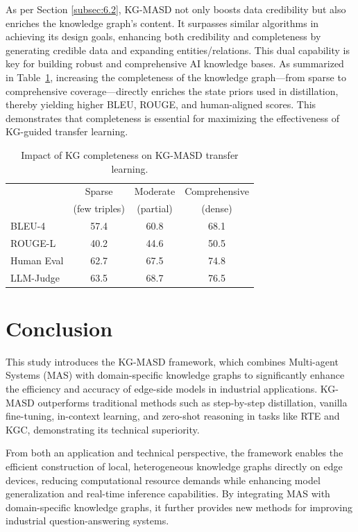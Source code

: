 \documentclass[preprint,12pt]{elsarticle}
\def\textbf#1{#1}%
\def\textit#1{#1}%
\begin{document}
As per Section \ref{subsec:6.2}, KG-MASD not only boosts data credibility but also enriches the knowledge graph's content. It surpasses similar algorithms in achieving its design goals, enhancing both credibility and completeness by generating credible data and expanding entities/relations. This dual capability is key for building robust and comprehensive AI knowledge bases.
As summarized in Table~\ref{tab:completeness_transfer}, increasing the completeness of the knowledge graph—from sparse to comprehensive coverage—directly enriches the state priors used in distillation, thereby yielding higher BLEU, ROUGE, and human-aligned scores. This demonstrates that completeness is essential for maximizing the effectiveness of KG-guided transfer learning.
\begin{table}[H]
\centering
\renewcommand{\arraystretch}{0.85}      %
\setlength{\tabcolsep}{2.5pt}          %
\begin{tabular}{lccc}
\toprule
 & \textbf{Sparse} & \textbf{Moderate} & \textbf{Comprehensive} \\
 & \textit{(few triples)} & \textit{(partial)} & \textit{(dense)} \\
\midrule
BLEU-4 & 57.4 & 60.8 & 68.1 \\
ROUGE-L & 40.2 & 44.6 & 50.5 \\
Human Eval & 62.7 & 67.5 & 74.8 \\
LLM-Judge & 63.5 & 68.7 & 76.5 \\
\bottomrule
\end{tabular}
\caption{Impact of KG completeness on KG-MASD transfer learning.}
\label{tab:completeness_transfer}
\end{table}
\section{Conclusion}
This study introduces the KG-MASD framework, which combines Multi-agent Systems (MAS) with domain-specific knowledge graphs to significantly enhance the efficiency and accuracy of edge-side models in industrial applications. KG-MASD outperforms traditional methods such as step-by-step distillation, vanilla fine-tuning, in-context learning, and zero-shot reasoning in tasks like RTE and KGC, demonstrating its technical superiority.

From both an application and technical perspective, the framework enables the efficient construction of local, heterogeneous knowledge graphs directly on edge devices, reducing computational resource demands while enhancing model generalization and real-time inference capabilities. By integrating MAS with domain-specific knowledge graphs, it further provides new methods for improving industrial question-answering systems.
\end{document}
